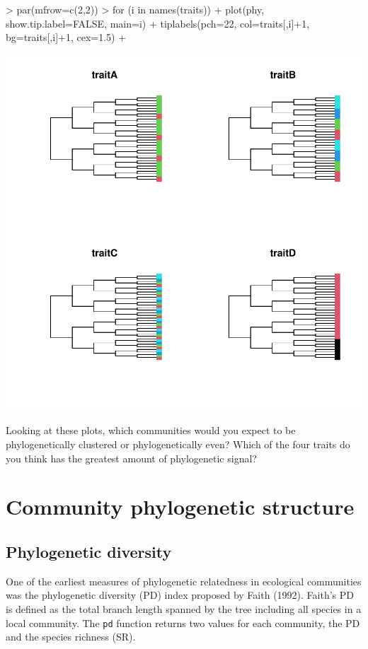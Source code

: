 \documentclass[12pt]{article}
\begin{document}
\begin{Schunk}
\begin{Sinput}
> par(mfrow=c(2,2))
> for (i in names(traits)) {
+ 	plot(phy, show.tip.label=FALSE, main=i)
+ 	tiplabels(pch=22, col=traits[,i]+1, bg=traits[,i]+1, cex=1.5)
+ }
\end{Sinput}
\end{Schunk}
\includegraphics{picante-intro-008}

Looking at these plots, which communities would you expect to be phylogenetically clustered or phylogenetically even? Which of the four traits do you think has the greatest amount of phylogenetic signal?

\section{Community phylogenetic structure}

\subsection{Phylogenetic diversity}

One of the earliest measures of phylogenetic relatedness in ecological communities was the phylogenetic diversity (PD) index proposed by Faith (1992). Faith's PD is defined as the total branch length spanned by the tree including all species in a local community. The \texttt{pd} function returns two values for each community, the PD and the species richness (SR).
\end{document}
